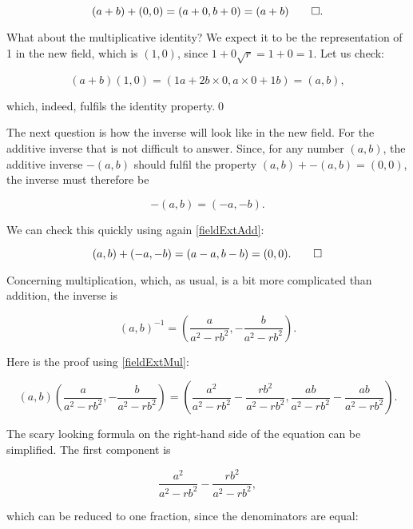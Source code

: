 \documentclass[tikz]{scrreprt}
\begin{document}
\begin{equation}
(a+b)+(0,0) = (a+0,b+0) = (a+b)\qed.
\end{equation}

What about the multiplicative identity?
We expect it to be the representation of 1 in the new field,
which is $(1,0)$, since $1+0\sqrt{r} = 1+0 = 1$.
Let us check:

\begin{equation}
(a+b)(1,0) = (1a+2b\times0,a\times 0+1b) = (a,b),
\end{equation}

which, indeed, fulfils the identity property.\qed

The next question is how the inverse will look like
in the new field.
For the additive inverse that is not difficult to answer.
Since, for any number $(a,b)$, the additive inverse $-(a,b)$
should fulfil the property $(a,b) + -(a,b) = (0,0)$,
the inverse must therefore be

\begin{equation}
-(a,b) = (-a,-b).
\end{equation}

We can check this quickly using again \ref{fieldExtAdd}:

\begin{equation}
(a,b) + (-a,-b)= (a-a,b-b)=(0,0).\qed
\end{equation}

Concerning multiplication, which, as usual, is a bit
more complicated than addition, the inverse is

\begin{equation}\label{fieldExtInvMul}
(a,b)^{-1} = \left(\frac{a}{a^2-rb^2},-\frac{b}{a^2-rb^2}\right).
\end{equation}

Here is the proof using \ref{fieldExtMul}:

\begin{equation}
\left(a,b\right)\left(\frac{a}{a^2-rb^2},-\frac{b}{a^2-rb^2}\right) = 
\left(\frac{a^2}{a^2-rb^2} - \frac{rb^2}{a^2-rb^2}, 
\frac{ab}{a^2-rb^2} - \frac{ab}{a^2-rb^2}\right). 
\end{equation}

The scary looking formula on the right-hand side of the equation
can be simplified. The first component is

\[
\frac{a^2}{a^2-rb^2} - \frac{rb^2}{a^2-rb^2},
\]

which can be reduced to one fraction,
since the denominators are equal:
\end{document}
